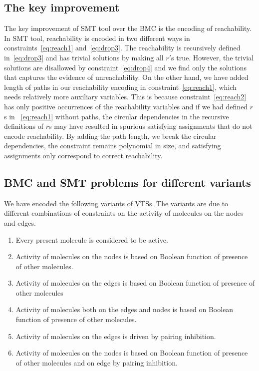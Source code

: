 
\subsection{The key improvement}
The key improvement of SMT tool over the BMC is the
encoding of reachability.
%
In SMT tool, reachability is encoded in two different
ways in constraints~\eqref{eq:reach1} and~\eqref{eq:drop3}.
%
The reachability is recursively defined in~\eqref{eq:drop3} and has
trivial solutions by making all $r'$s true.
%
However, the trivial solutions are disallowed by constraint~\eqref{eq:drop4} and we find
only the solutions that captures the evidence of unreachability.
%
On the other hand,
we have added length of paths in our reachability encoding in constraint~\eqref{eq:reach1},
which needs relatively more auxiliary variables.
%
This is because constraint~\eqref{eq:reach2} has only positive
occurrences of the reachability variables and if we had defined
$r$s in ~\eqref{eq:reach1} without paths,
the circular dependencies in the recursive definitions of $r$s
may have resulted in spurious satisfying assignments that
do not encode reachability.
%
By adding the path length, we break the circular dependencies, the
constraint remains polynomial in size, and satisfying assignments only
correspond to correct reachability.



\subsection{BMC and SMT problems for different variants}

We have encoded the following variants of VTSs.
%
The variants are due to different combinations of constraints on the
activity of molecules on the nodes and edges.
%
\begin{enumerate}
\item Every present molecule is considered to be active.
\item Activity of molecules on the nodes is based on Boolean function of presence of other molecules. 
\item Activity of molecules on the edges is based on Boolean function of presence of other molecules
\item Activity of molecules both on the edges and nodes is based on Boolean function of presence of other molecules.
\item Activity of molecules on the edges is driven by pairing inhibition.
\item Activity of molecules on the nodes is based on Boolean function of presence of other molecules and on edge by pairing inhibition.
\end{enumerate}
%
%


